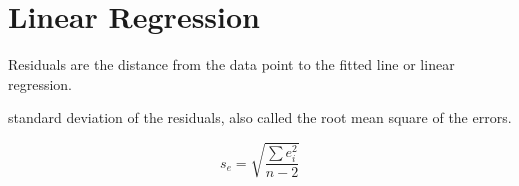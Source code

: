 	\chapter{Linear Regression}
Residuals are the distance from the data point to the fitted line or linear regression.

standard deviation of the residuals, also called the root mean square of the errors.

	\begin{equation}
		s_e = \sqrt{\frac{\sum e_i^2}{n-2}}
	\end{equation}
	\begin{mathwhere}
	\end{mathwhere}